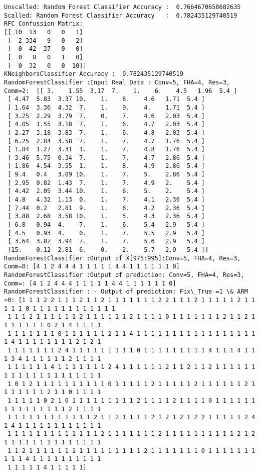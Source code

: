 \documentclass[11pt]{article}
\begin{document}
    \begin{Verbatim}[commandchars=\\\{\}]
Unscalled: Random Forest Classifier Accuracy :  0.7664670658682635
Scalled: Random Forest Classifier Accuracy   :  0.782435129740519
RFC Confussion Matrix: 
[[ 10  13   0   0   1]
 [  2 334   9   0   2]
 [  0  42  37   0   0]
 [  0   8   0   1   0]
 [  0  32   0   0  10]]
KNeighborsClassifier Accuracy :  0.782435129740519
RandomForestClassifier :Input Real Data : Conv=5, FHA=4, Res=3, Comm=2:  [[ 3.    1.55  3.17  7.    1.    6.    4.5   1.96  5.4 ]
 [ 4.47  5.83  3.37 10.    1.    8.    4.6   1.71  5.4 ]
 [ 1.64  3.36  4.32  7.    1.    9.    4.    1.71  5.4 ]
 [ 3.25  2.29  3.79  7.    0.    7.    4.6   2.03  5.4 ]
 [ 4.05  1.55  3.18  7.    1.    6.    4.7   2.03  5.4 ]
 [ 2.27  3.18  3.83  7.    1.    6.    4.8   2.03  5.4 ]
 [ 6.25  2.84  3.58  7.    1.    7.    4.7   1.76  5.4 ]
 [ 1.84  1.27  3.31  1.    1.    7.    4.8   1.76  5.4 ]
 [ 3.46  5.75  0.34  7.    1.    7.    4.7   2.86  5.4 ]
 [ 1.86  4.54  3.55  1.    1.    8.    4.9   2.86  5.4 ]
 [ 9.4   0.4   3.09 10.    1.    7.    5.    2.86  5.4 ]
 [ 2.95  0.82  1.43  7.    1.    7.    4.9   2.    5.4 ]
 [ 4.42  2.05  3.44 10.    1.    6.    5.    2.    5.4 ]
 [ 4.8   4.32  1.13  0.    1.    7.    4.1   2.36  5.4 ]
 [ 7.44  0.2   2.81  9.    1.    6.    4.2   2.36  5.4 ]
 [ 3.88  2.68  3.58 10.    1.    5.    4.3   2.36  5.4 ]
 [ 6.8   0.94  4.    7.    1.    6.    5.4   2.9   5.4 ]
 [ 4.5   0.93  4.    0.    1.    7.    5.5   2.9   5.4 ]
 [ 3.64  3.87  3.94  7.    1.    7.    5.6   2.9   5.4 ]
 [15.    0.12  2.81  6.    0.    2.    5.7   2.9   5.4 ]]
RandomForestClassifier :Output of X[975:995]:Conv=5, FHA=4, Res=3, Comm=0: [4 1 2 4 4 4 1 1 1 1 1 4 4 1 1 1 1 1 1 0]
RandomForestClassifier :Output of prediction: Conv=5, FHA=4, Res=3, Comm=: [4 1 2 4 4 4 1 1 1 1 1 4 4 1 1 1 1 1 1 0]
RandomForestClassifier : - Output of prediction: Fix\_True =1 \& ARM =0: [1 1 1 2 2 1 1 1 2 1 1 2 1 1 1 1 1 1 1 2 2 1 1 1 2 1 1 1 1 1 2 1 1 1 1 1 0 1 1 1 1 1 1 1 1 1 1 1 1
 1 1 1 2 1 1 1 1 1 1 2 1 1 1 1 1 1 2 1 1 1 1 0 1 1 1 1 1 1 1 2 1 1 2 1 1 1 1 1 1 1 0 2 1 4 1 1 1 1
 1 1 1 1 1 1 1 0 1 1 1 1 1 1 2 1 1 4 1 1 1 1 1 1 1 1 1 1 1 1 1 1 1 1 1 1 4 1 1 1 1 1 1 1 1 2 1 2 1
 1 1 1 1 1 1 1 2 4 1 1 1 1 1 1 1 1 1 0 1 1 1 1 1 1 1 1 1 4 1 1 1 4 1 1 1 3 4 1 1 1 1 1 1 2 1 1 1 1
 1 1 1 1 1 1 4 1 1 1 1 1 1 1 2 4 1 1 1 1 1 1 2 1 1 2 1 1 2 1 1 1 1 1 1 1 1 1 1 1 1 1 1 1 1 1 1 1 1
 1 0 1 2 1 1 1 1 1 1 1 1 1 1 0 1 1 1 1 1 2 1 1 1 1 1 2 1 1 1 1 1 1 2 1 1 1 1 1 1 1 2 1 1 0 1 1 1 1
 1 1 1 1 1 0 2 1 0 1 1 1 1 1 1 1 1 1 2 1 1 1 1 2 1 1 1 1 0 1 1 1 1 1 1 1 1 1 1 1 1 1 1 1 2 1 1 1 1
 1 1 1 1 1 1 1 1 1 1 1 1 2 1 1 2 1 1 1 1 2 1 2 1 2 1 2 2 1 1 1 1 1 2 4 1 4 1 1 1 1 1 1 1 1 1 1 1 1
 1 1 1 1 1 1 1 1 1 1 1 1 1 2 1 1 1 1 1 1 1 2 1 1 1 1 1 1 1 1 1 1 2 1 2 1 1 1 1 1 1 1 1 1 1 1 1 1 1
 1 1 2 1 1 1 1 1 1 1 1 1 1 1 1 1 1 1 1 2 1 1 1 1 1 1 1 0 1 1 1 1 1 1 1 1 1 1 4 1 1 1 1 1 1 1 1 1 1
 1 1 1 1 1 4 1 1 1 1 1]

    \end{Verbatim}
\end{document}
